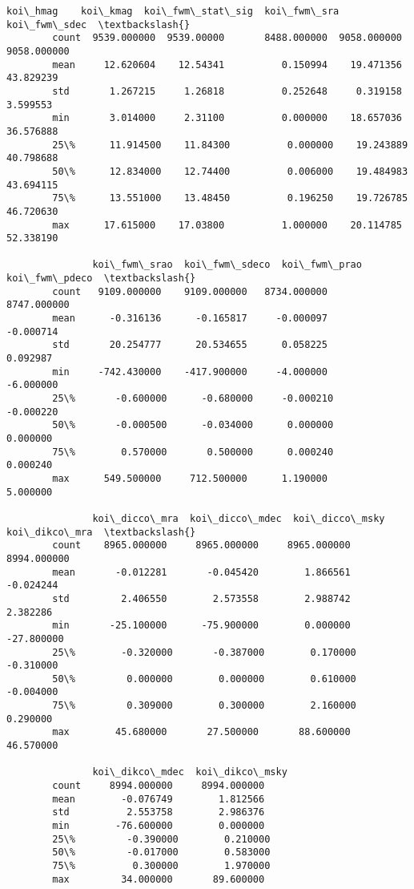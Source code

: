 \documentclass[11pt]{article}
\begin{document}
\begin{Verbatim}[commandchars=\\\{\}]
                  koi\_hmag    koi\_kmag  koi\_fwm\_stat\_sig  koi\_fwm\_sra  koi\_fwm\_sdec  \textbackslash{}
        count  9539.000000  9539.00000       8488.000000  9058.000000   9058.000000   
        mean     12.620604    12.54341          0.150994    19.471356     43.829239   
        std       1.267215     1.26818          0.252648     0.319158      3.599553   
        min       3.014000     2.31100          0.000000    18.657036     36.576888   
        25\%      11.914500    11.84300          0.000000    19.243889     40.798688   
        50\%      12.834000    12.74400          0.006000    19.484983     43.694115   
        75\%      13.551000    13.48450          0.196250    19.726785     46.720630   
        max      17.615000    17.03800          1.000000    20.114785     52.338190   
        
               koi\_fwm\_srao  koi\_fwm\_sdeco  koi\_fwm\_prao  koi\_fwm\_pdeco  \textbackslash{}
        count   9109.000000    9109.000000   8734.000000    8747.000000   
        mean      -0.316136      -0.165817     -0.000097      -0.000714   
        std       20.254777      20.534655      0.058225       0.092987   
        min     -742.430000    -417.900000     -4.000000      -6.000000   
        25\%       -0.600000      -0.680000     -0.000210      -0.000220   
        50\%       -0.000500      -0.034000      0.000000       0.000000   
        75\%        0.570000       0.500000      0.000240       0.000240   
        max      549.500000     712.500000      1.190000       5.000000   
        
               koi\_dicco\_mra  koi\_dicco\_mdec  koi\_dicco\_msky  koi\_dikco\_mra  \textbackslash{}
        count    8965.000000     8965.000000     8965.000000    8994.000000   
        mean       -0.012281       -0.045420        1.866561      -0.024244   
        std         2.406550        2.573558        2.988742       2.382286   
        min       -25.100000      -75.900000        0.000000     -27.800000   
        25\%        -0.320000       -0.387000        0.170000      -0.310000   
        50\%         0.000000        0.000000        0.610000      -0.004000   
        75\%         0.309000        0.300000        2.160000       0.290000   
        max        45.680000       27.500000       88.600000      46.570000   
        
               koi\_dikco\_mdec  koi\_dikco\_msky  
        count     8994.000000     8994.000000  
        mean        -0.076749        1.812566  
        std          2.553758        2.986376  
        min        -76.600000        0.000000  
        25\%         -0.390000        0.210000  
        50\%         -0.017000        0.583000  
        75\%          0.300000        1.970000  
        max         34.000000       89.600000  
\end{Verbatim}
            
\end{document}
